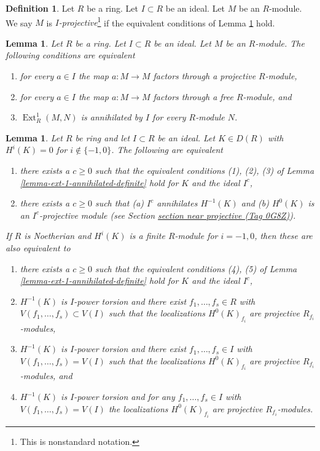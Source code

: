 \documentclass{amsart}
\theoremstyle{plain}
\newtheorem{lemma}[subsection]{Lemma}
\theoremstyle{definition}
\newtheorem{definition}[subsection]{Definition}
\theoremstyle{remark}
\numberwithin{equation}{subsection}
\def\Ext{\mathop{\mathrm{Ext}}\nolimits}
\begin{document}
\begin{definition}
\label{definition-near-projective}
Let $R$ be a ring. Let $I \subset R$ be an ideal. Let $M$ be an $R$-module.
We say $M$ is {\it $I$-projective}\footnote{This is nonstandard notation.}
if the equivalent conditions of Lemma \ref{lemma-near-projective} hold.
\end{definition}

\begin{lemma}
\label{lemma-near-projective}
Let $R$ be a ring. Let $I \subset R$ be an ideal. Let $M$ be an $R$-module.
The following conditions are equivalent
\begin{enumerate}
\item for every $a \in I$ the map $a : M \to M$ factors through a projective
$R$-module,
\item for every $a \in I$ the map $a : M \to M$ factors through a free
$R$-module, and
\item $\Ext^1_R(M, N)$ is annihilated by $I$ for every $R$-module $N$.
\end{enumerate}
\end{lemma}

\begin{lemma}
\label{lemma-ext-1-annihilated}
Let $R$ be ring and let $I \subset R$ be an ideal.
Let $K \in D(R)$ with $H^i(K) = 0$ for $i \not \in \{-1, 0\}$.
The following are equivalent
\begin{enumerate}
\item there exists a $c \geq 0$ such that the equivalent
conditions (1), (2), (3) of Lemma \ref{lemma-ext-1-annihilated-definite}
hold for $K$ and the ideal $I^c$,
\item there exists a $c \geq 0$ such that (a) $I^c$ annihilates
$H^{-1}(K)$ and (b) $H^0(K)$ is an $I^c$-projective module (see
Section \href{https://stacks.math.columbia.edu/tag/0G8Z}{section near projective (Tag 0G8Z)}).
\end{enumerate}
If $R$ is Noetherian and $H^i(K)$ is a finite $R$-module
for $i = -1, 0$, then these are also equivalent to
\begin{enumerate}
\item[(3)] there exists a $c \geq 0$ such that the equivalent
conditions (4), (5) of Lemma \ref{lemma-ext-1-annihilated-definite}
hold for $K$ and the ideal $I^c$,
\item[(4)] $H^{-1}(K)$ is $I$-power torsion and there exist
$f_1, \ldots, f_s \in R$ with $V(f_1, \ldots, f_s) \subset V(I)$
such that the localizations $H^0(K)_{f_i}$ are projective
$R_{f_i}$-modules,
\item[(5)] $H^{-1}(K)$ is $I$-power torsion and there exist
$f_1, \ldots, f_s \in I$ with $V(f_1, \ldots, f_s) = V(I)$
such that the localizations $H^0(K)_{f_i}$ are projective
$R_{f_i}$-modules, and
\item[(6)] $H^{-1}(K)$ is $I$-power torsion and for any
$f_1, \ldots, f_s \in I$ with $V(f_1, \ldots, f_s) = V(I)$
the localizations $H^0(K)_{f_i}$ are projective $R_{f_i}$-modules.
\end{enumerate}
\end{lemma}
\end{document}
